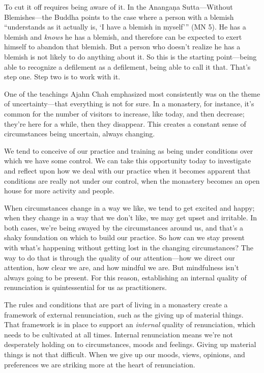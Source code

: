 To cut it off requires being aware of it. In the Anangaṇa 
Sutta---Without Blemishes---the Buddha points to the case where a 
person with a blemish ``understands as it actually is, `I have a 
blemish in myself'\thinspace'' (MN 5). He has a blemish and 
\emph{knows} he has a blemish, and therefore can be expected to exert 
himself to abandon that blemish. But a person who doesn't realize he 
has a blemish is not likely to do anything about it. So this is the 
starting point---being able to recognize a defilement as a defilement, 
being able to call it that. That's step one. Step two is to work with 
it.


One of the teachings Ajahn Chah emphasized most consistently was on the 
theme of uncertainty---that everything is not for sure. In a monastery, 
for instance, it's common for the number of visitors to increase, like 
today, and then decrease; they're here for a while, then they 
disappear. This creates a constant sense of circumstances being 
uncertain, always changing.

We tend to conceive of our practice and training as being under 
conditions over which we have some control. We can take this 
opportunity today to investigate and reflect upon how we deal with our 
practice when it becomes apparent that conditions are really not under 
our control, when the monastery becomes an open house for more activity 
and people.

When circumstances change in a way we like, we tend to get excited and 
happy; when they change in a way that we don't like, we may get upset 
and irritable. In both cases, we're being swayed by the circumstances 
around us, and that's a shaky foundation on which to build our 
practice. So how can we stay present with what's happening without 
getting lost in the changing circumstances? The way to do that is 
through the quality of our attention---how we direct our attention, how 
clear we are, and how mindful we are. But mindfulness isn't always 
going to be present. For this reason, establishing an internal quality 
of renunciation is quintessential for us as practitioners.

The rules and conditions that are part of living in a monastery create 
a framework of external renunciation, such as the giving up of material 
things. That framework is in place to support an \emph{internal} 
quality of renunciation, which needs to be cultivated at all times. 
Internal renunciation means we're not desperately holding on to 
circumstances, moods and feelings. Giving up material things is not 
that difficult. When we give up our moods, views, opinions, and 
preferences we are striking more at the heart of renunciation.

